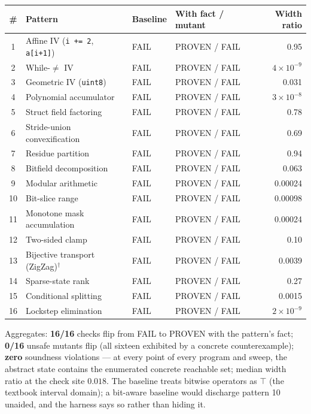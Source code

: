 \documentclass[11pt,a4paper]{article}
\begin{document}
\begin{center}
\begin{tabular}{clllr}
\toprule
\# & Pattern & Baseline & With fact / mutant & Width ratio \\
\midrule
1 & Affine IV (\texttt{i += 2}, \texttt{a[i+1]}) & FAIL & PROVEN / FAIL & 0.95 \\
2 & While-$\ne$ IV & FAIL & PROVEN / FAIL & $4\times10^{-9}$ \\
3 & Geometric IV (\texttt{uint8}) & FAIL & PROVEN / FAIL & 0.031 \\
4 & Polynomial accumulator & FAIL & PROVEN / FAIL & $3\times10^{-8}$ \\
5 & Struct field factoring & FAIL & PROVEN / FAIL & 0.78 \\
6 & Stride-union convexification & FAIL & PROVEN / FAIL & 0.69 \\
7 & Residue partition & FAIL & PROVEN / FAIL & 0.94 \\
8 & Bitfield decomposition & FAIL & PROVEN / FAIL & 0.063 \\
9 & Modular arithmetic & FAIL & PROVEN / FAIL & 0.00024 \\
10 & Bit-slice range & FAIL & PROVEN / FAIL & 0.00098 \\
11 & Monotone mask accumulation & FAIL & PROVEN / FAIL & 0.00024 \\
12 & Two-sided clamp & FAIL & PROVEN / FAIL & 0.10 \\
13 & Bijective transport (ZigZag)$^\dagger$ & FAIL & PROVEN / FAIL & 0.0039 \\
14 & Sparse-state rank & FAIL & PROVEN / FAIL & 0.27 \\
15 & Conditional splitting & FAIL & PROVEN / FAIL & 0.0015 \\
16 & Lockstep elimination & FAIL & PROVEN / FAIL & $2\times10^{-9}$ \\
\bottomrule
\end{tabular}
\end{center}

\noindent
Aggregates: \textbf{16/16} checks flip from FAIL to PROVEN with the pattern's fact;
\textbf{0/16} unsafe mutants flip (all sixteen exhibited by a concrete counterexample);
\textbf{zero} soundness violations --- at every point of every program and sweep, the
abstract state contains the enumerated concrete reachable set; median width ratio at the
check site $0.018$. The baseline treats bitwise operators as $\top$ (the textbook
interval domain); a bit-aware baseline would discharge pattern 10 unaided, and the
harness says so rather than hiding it.
\end{document}
